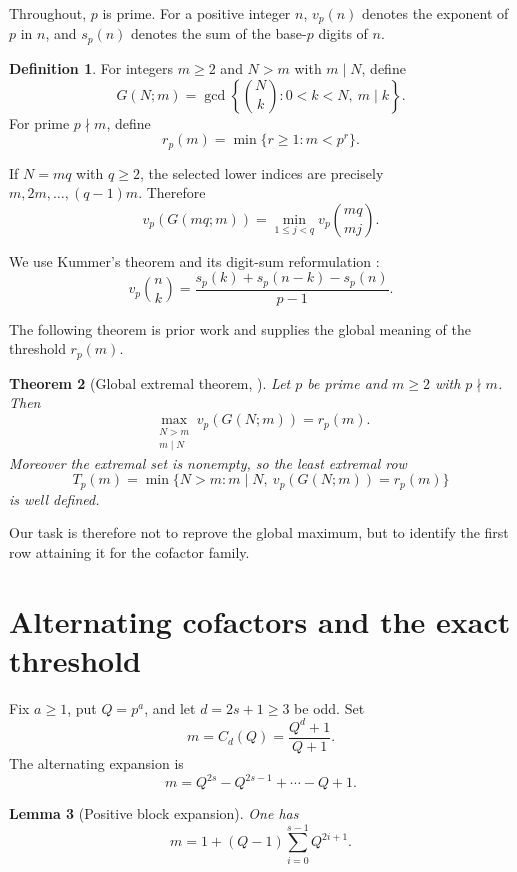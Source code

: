 \documentclass[11pt]{article}
\newtheorem{theorem}{Theorem}[section]
\newtheorem{lemma}[theorem]{Lemma}
\theoremstyle{definition}
\newtheorem{definition}[theorem]{Definition}
\theoremstyle{remark}
\begin{document}
Throughout, \(p\) is prime.  For a positive integer \(n\), \(v_p(n)\) denotes
the exponent of \(p\) in \(n\), and \(s_p(n)\) denotes the sum of the base-\(p\)
digits of \(n\).

\begin{definition}
For integers \(m\ge2\) and \(N>m\) with \(m\mid N\), define
\[
  G(N;m)=\gcd\left\{\binom Nk:0<k<N,\ m\mid k\right\}.
\]
For prime \(p\nmid m\), define
\[
  r_p(m)=\min\{r\ge1:m<p^r\}.
\]
\end{definition}

If \(N=mq\) with \(q\ge2\), the selected lower indices are precisely
\(m,2m,\ldots,(q-1)m\).  Therefore
\begin{equation}\label{eq:gcd-min}
  v_p(G(mq;m))
  =
  \min_{1\le j<q}v_p\binom{mq}{mj}.
\end{equation}

We use Kummer's theorem and its digit-sum reformulation
\cite{Kummer1852,Granville1997}:
\begin{equation}\label{eq:kummer-digit}
  v_p\binom nk
  =
  \frac{s_p(k)+s_p(n-k)-s_p(n)}{p-1}.
\end{equation}

The following theorem is prior work and supplies the global meaning of the
threshold \(r_p(m)\).

\begin{theorem}[Global extremal theorem, \cite{FairfaxBallExtremes2026}]
\label{thm:prior-global}
Let \(p\) be prime and \(m\ge2\) with \(p\nmid m\).  Then
\[
  \max_{\substack{N>m\\m\mid N}}v_p(G(N;m))=r_p(m).
\]
Moreover the extremal set is nonempty, so the least extremal row
\[
  T_p(m)=
  \min\{N>m:m\mid N,\ v_p(G(N;m))=r_p(m)\}
\]
is well defined.
\end{theorem}

Our task is therefore not to reprove the global maximum, but to identify the
first row attaining it for the cofactor family.

\section{Alternating cofactors and the exact threshold}\label{sec:threshold}

Fix \(a\ge1\), put \(Q=p^a\), and let \(d=2s+1\ge3\) be odd.  Set
\[
  m=C_d(Q)=\frac{Q^d+1}{Q+1}.
\]
The alternating expansion is
\[
  m=Q^{2s}-Q^{2s-1}+\cdots-Q+1.
\]

\begin{lemma}[Positive block expansion]\label{lem:block}
One has
\[
  m=1+(Q-1)\sum_{i=0}^{s-1}Q^{2i+1}.
\]
\end{lemma}
\end{document}
